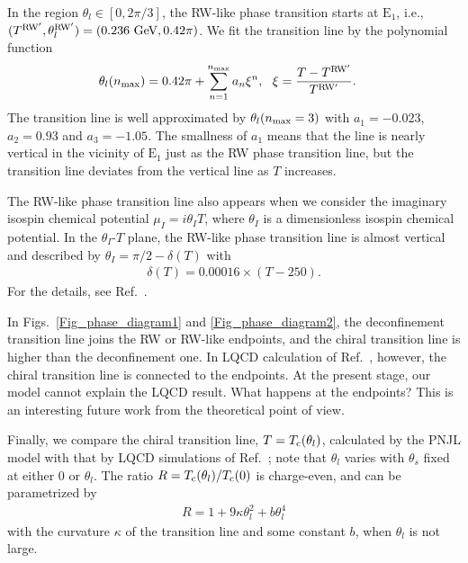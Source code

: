 \documentclass[prd,superscriptaddress,unsortedaddress,
twocolumn,showpacs,preprintnumbers,amsmath,amssymb]{revtex4}
\begin{document}
  In the region $\theta_{l}\in\left[0,2\pi/3\right]$,
  the RW-like phase transition starts at $\textrm{E}_{1}$,
  i.e., $(T^{\rm RW'}, \theta^{\rm RW'}_{l})
  =(0.236\ \textrm{GeV}, 0.42\pi)$.
  We fit the transition line
  by the polynomial function
  \begin{align}
   \theta_{l}(n_{\rm max})
   &=0.42\pi+\sum_{n=1}^{n_{\rm max}}a_{n}\xi^n,\ \ 
   \xi=\frac{T-T^{\rm RW'}}{T^{\rm RW'}}.
   \label{polynomial}
  \end{align}
  The transition line
  is well approximated by $\theta_{l}(n_{\rm max}=3)$
  with $a_{1}=-0.023$, $a_{2}=0.93$ and $a_{3}=-1.05$.
  The smallness of $a_{1}$ means that
  the line is nearly vertical
  in the vicinity of $\textrm{E}_{1}$ just as the RW phase transition line,
  but the transition line deviates from the vertical line
  as $T$ increases.

  The RW-like phase transition line also appears
  when we consider the imaginary isospin chemical potential
  $\mu_{I}=i\theta_{I}T$, where $\theta_{I}$ is a
  dimensionless isospin chemical potential.
  In the $\theta_{I}$-$T$ plane,
  the RW-like phase transition line is almost vertical
  and described by $\theta_{I}=\pi/2-\delta(T)$ with~\cite{Cea}
  \begin{eqnarray}
   \delta(T)=0.00016\times (T-250).
  \end{eqnarray}
  For the details, see Ref.~\cite{Sakai_JPhys, Cea}.

In Figs.~\ref{Fig_phase_diagram1} and \ref{Fig_phase_diagram2}, 
the deconfinement transition line joins the RW or RW-like endpoints, 
and the chiral transition line is higher than the deconfinement one. 
In LQCD calculation of Ref.~\cite{Bonati3}, however, 
the chiral transition line is connected to the endpoints.
At the present stage, our model cannot explain the LQCD result. 
What happens at the endpoints? This is an interesting future work 
from the theoretical point of view. 

  Finally, we compare the chiral transition line, $T=T_{\rm c}(\theta_{l})$, 
  calculated by the PNJL model with that by LQCD simulations of 
  Ref.~\cite{Bonati2}; note that $\theta_{l}$ varies with $\theta_{s}$ fixed 
at either 0 or $\theta_{l}$. 
 The ratio $R=T_{\rm c}(\theta_{l})/T_{\rm c}(0)$ is charge-even,
 and can be parametrized by~\cite{Bonati,Bonati2} 
  \begin{eqnarray}
   R=1+9\kappa\theta^2_{l}+b\theta^4_{l}
  \end{eqnarray}
  with the curvature $\kappa$ of the transition line and some constant $b$, 
  when $\theta_{l}$ is not large. 
\end{document}
